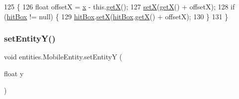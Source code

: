 \begin{DoxyCode}
125                                     \{
126         \textcolor{keywordtype}{float} offsetX = \mbox{\hyperlink{classorg_1_1newdawn_1_1slick_1_1geom_1_1_shape_a3e985bfff386c15a4efaad03d8ad60d3}{x}} - this.\mbox{\hyperlink{classorg_1_1newdawn_1_1slick_1_1geom_1_1_shape_a736a47bfdd6f164558b43fd497a3a3f3}{getX}}();
127         \mbox{\hyperlink{classorg_1_1newdawn_1_1slick_1_1geom_1_1_shape_a1469b8ef682642c4257869640c27bf16}{setX}}(\mbox{\hyperlink{classorg_1_1newdawn_1_1slick_1_1geom_1_1_shape_a736a47bfdd6f164558b43fd497a3a3f3}{getX}}() + offsetX);
128         \textcolor{keywordflow}{if} (\mbox{\hyperlink{classentities_1_1_mobile_entity_a996d583dcbf4fd5609e14ec87dbfa7a6}{hitBox}} != null) \{
129             \mbox{\hyperlink{classentities_1_1_mobile_entity_a996d583dcbf4fd5609e14ec87dbfa7a6}{hitBox}}.\mbox{\hyperlink{classorg_1_1newdawn_1_1slick_1_1geom_1_1_shape_a1469b8ef682642c4257869640c27bf16}{setX}}(\mbox{\hyperlink{classentities_1_1_mobile_entity_a996d583dcbf4fd5609e14ec87dbfa7a6}{hitBox}}.\mbox{\hyperlink{classorg_1_1newdawn_1_1slick_1_1geom_1_1_shape_a736a47bfdd6f164558b43fd497a3a3f3}{getX}}() + offsetX);
130         \}
131     \}
\end{DoxyCode}
\mbox{\label{classentities_1_1_mobile_entity_a08206aa00cd7b2e7d5cfeb2b1b2338cb}} 
\subsubsection{\texorpdfstring{set\+Entity\+Y()}{setEntityY()}}
{\footnotesize\ttfamily void entities.\+Mobile\+Entity.\+set\+EntityY (\begin{DoxyParamCaption}\item[{float}]{y }\end{DoxyParamCaption})\hspace{0.3cm}{\ttfamily [inline]}}


